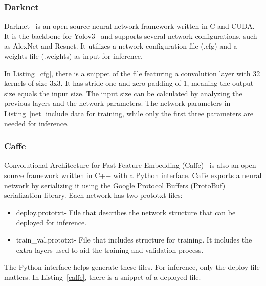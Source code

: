 \subsubsection{Darknet}

Darknet~\cite{Darknet} is an open-source neural network framework written in C
and CUDA. It is the backbone for Yolov3~\cite{yolov3} and supports
several network configurations, such as AlexNet and Resnet.  It
utilizes a network configuration file (.cfg) and a weights file (.weights) as
input for inference.



In Listing~\ref{cfg}, there is a snippet of the file featuring a convolution
layer with 32 kernels of size 3x3. It has stride one and zero padding of 1,
meaning the output size equals the input size. The input size can be
calculated by analyzing the previous layers and the network parameters. The
network parameters in Listing~\ref{net} include data for training, while only
the first three parameters are needed for inference.




\subsubsection{Caffe}

Convolutional Architecture for Fast Feature Embedding (Caffe)~\cite{caffe} is
also an open-source framework written in C++ with a Python interface.  Caffe
exports a neural network by serializing it using the Google Protocol Buffers
(ProtoBuf) serialization library. Each network has two prototxt files:
\begin{itemize}
    \item deploy.prototxt- File that describes the network structure that
      can be deployed for inference.
    \item train\_val.prototxt- File that includes structure for training.  It
      includes the extra layers used to aid the training and validation process.
\end{itemize}

The Python interface helps generate these files. For inference, only the
deploy file matters. In Listing~\ref{caffe}, there is a snippet of a deployed file. 


